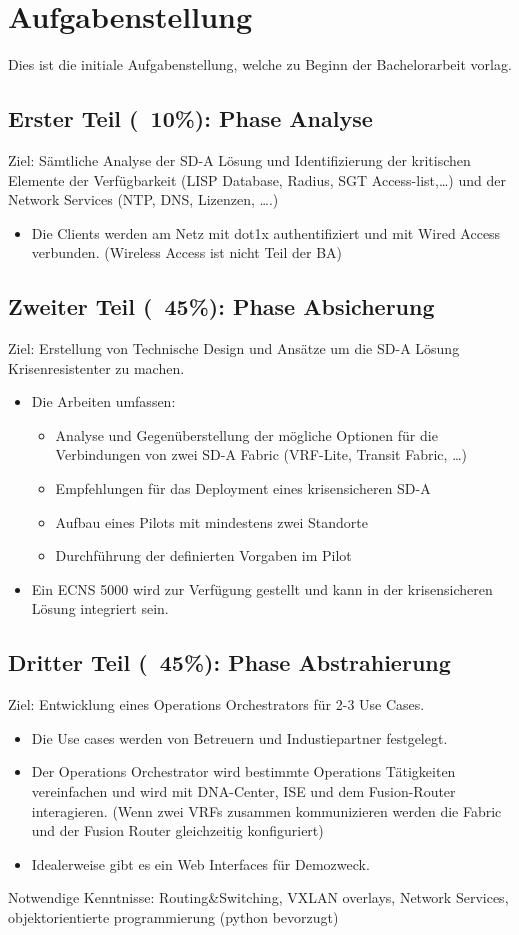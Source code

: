 \section{Aufgabenstellung}
Dies ist die initiale Aufgabenstellung, welche zu Beginn der Bachelorarbeit vorlag. 

\subsection{Erster Teil (~10\%): Phase Analyse}
Ziel: Sämtliche Analyse der SD-A Lösung und Identifizierung der kritischen Elemente der Verfügbarkeit (LISP Database, Radius, SGT Access-list,…) und der Network Services (NTP, DNS, Lizenzen, ….)
\begin{itemize}
	\item Die Clients werden am Netz mit dot1x authentifiziert und mit Wired Access verbunden. (Wireless Access ist nicht Teil der BA)
\end{itemize}


\subsection{Zweiter Teil (~45\%): Phase Absicherung}
Ziel: Erstellung von Technische Design und Ansätze um die SD-A Lösung Krisenresistenter zu machen.
\begin{itemize}
	\item Die Arbeiten umfassen:
	\begin{itemize}
		\item Analyse und Gegenüberstellung der mögliche Optionen für die Verbindungen von zwei SD-A Fabric (VRF-Lite, Transit Fabric, …)
		\item Empfehlungen für das Deployment eines krisensicheren SD-A
		\item Aufbau eines Pilots mit mindestens zwei Standorte
		\item Durchführung der definierten Vorgaben im Pilot
	\end{itemize}
	\item Ein ECNS 5000 wird zur Verfügung gestellt und kann in der krisensicheren Lösung integriert sein.
\end{itemize}


\subsection{Dritter Teil (~45\%): Phase Abstrahierung}
Ziel: Entwicklung eines Operations Orchestrators für 2-3 Use Cases. 
\begin{itemize}
	\item Die Use cases werden von Betreuern und Industiepartner festgelegt.
	\item Der Operations Orchestrator wird bestimmte Operations Tätigkeiten vereinfachen und wird mit DNA-Center, ISE und dem Fusion-Router interagieren. (Wenn zwei VRFs zusammen kommunizieren werden die Fabric und der Fusion Router gleichzeitig konfiguriert)
	\item Idealerweise gibt es ein Web Interfaces für Demozweck.
\end{itemize}

Notwendige Kenntnisse: Routing\&Switching, VXLAN overlays, Network Services, objektorientierte programmierung (python bevorzugt)


